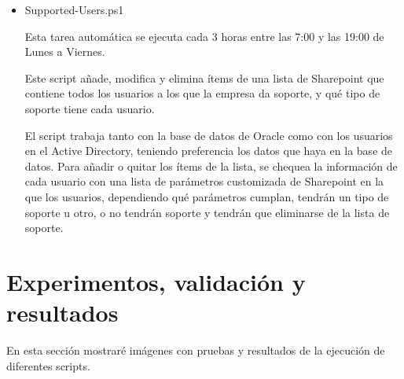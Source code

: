 \documentclass[a4paper, 12pt]{book}
\begin{document}
\begin{itemize}
\item Supported-Users.ps1

Esta tarea automática se ejecuta cada 3 horas entre las 7:00 y las 19:00 de Lunes a Viernes.

Este script añade, modifica y elimina ítems de una lista de Sharepoint que contiene todos los usuarios a los que la empresa da soporte, y qué tipo de soporte tiene cada usuario.

El script trabaja tanto con la base de datos de Oracle como con los usuarios en el Active Directory, teniendo preferencia los datos que haya en la base de datos. Para añadir o quitar los ítems de la lista, se chequea la información de cada usuario con una lista de parámetros customizada de Sharepoint en la que los usuarios, dependiendo qué parámetros cumplan, tendrán un tipo de soporte u otro, o no tendrán soporte y tendrán que eliminarse de la lista de soporte.
\end{itemize}



\cleardoublepage
\chapter{Experimentos, validación y resultados}
\label{chap:Experimentos, validación y resultados}

En esta sección mostraré imágenes con pruebas y resultados de la ejecución de diferentes scripts.
\end{document}
